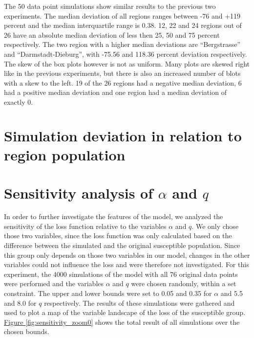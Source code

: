 The 50 data point simulations show similar results to the previous two experiments. The median deviation of all regions
ranges between -76 and +119 percent and the median interquartile range is 0.38. 12, 22 and 24 regions out of 26 have an
absolute median deviation of less then 25, 50 and 75 percent respectively. The two region with a higher median
deviations are ``Bergstrasse'' and ``Darmstadt-Dieburg'', with -75.56 and 118.36 percent deviation respectively.
The skew of the box plots however is not as uniform. Many plots are skewed right like in the previous experiments, but
there is also an increased number of blots with a skew to the left. 19 of the 26 regions had a negative median deviation,
6 had a positive median deviation and one region had a median deviation of exactly 0.



\section{Simulation deviation in relation to region population}






\section{Sensitivity analysis of $\alpha$ and $q$}
In order to further investigate the features of the model, we analyzed the sensitivity of the loss function relative to
the variables $\alpha$ and $q$. We only chose those two variables, since the loss function was only calculated based
on the difference between the simulated and the original susceptible population. Since this group only depends on those
two variables in our model, changes in the other variables could not influence the loss and were therefore not investigated.
For this experiment, the 4000 simulations of the model with all 76 original data points were performed and the variables
$\alpha$ and $q$ were chosen randomly, within a set constraint. The upper and lower bounds were set to 0.05 and 0.35 for 
$\alpha$ and 5.5 and 8.0 for $q$ respectively. The results of these simulations were gathered and used to plot a map
of the variable landscape of the loss of the susceptible group.
\hyperref[fig:sensitivity_zoom0]{Figure \ref*{fig:sensitivity_zoom0}} shows the total result of all simulations over the
chosen bounds.


